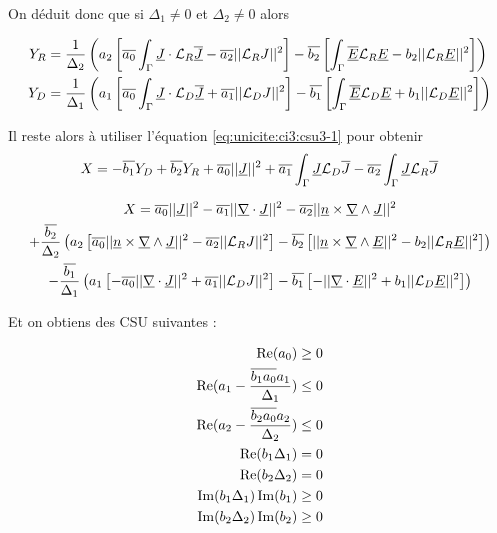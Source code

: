 On déduit donc que si $\Delta_1 \not = 0$ et $\Delta_2 \not = 0$ alors

\begin{align}
  Y_R &= \frac{1}{\Delta_2}\left(a_2\left[\conj{a_0}\int_\Gamma \J\cdot\LR\conj{\J} - \conj{a_2}||\LR J||^2\right]  -\conj{b_2}\left[\int_\Gamma \conj{\E}\LR{\E} - b_2 ||\LR \E ||^2\right]\right) \\
  Y_D &= \frac{1}{\Delta_1}\left(a_1\left[\conj{a_0}\int_\Gamma \J\cdot\LD\conj{\J} + \conj{a_1}||\LD J||^2\right]  -\conj{b_1}\left[\int_\Gamma \conj{\E}\LD{\E} + b_1 ||\LD \E ||^2\right]\right) 
\end{align}

Il reste alors à utiliser l'équation \eqref{eq:unicite:ci3:csu3-1} pour obtenir
\begin{equation}
X = -\conj{b_1} Y_D + \conj{b_2} Y_R + \conj{a_0} || \J ||^2 + \conj{a_1} \int_\Gamma \J \LD \conj{J} - \conj{a_2} \int_\Gamma \J \LR \conj{J} 
\end{equation}

\begin{multline}
X = \conj{a_0} || \J ||^2 - \conj{a_1} || \div \J ||^2 - \conj{a_2} || \n \times \rot \J ||^2\\
 + \frac{\conj{b_2}}{\Delta_2}\left(a_2\left[\conj{a_0}||\n \times \rot \J||^2 - \conj{a_2}||\LR J||^2\right]  -\conj{b_2}\left[||\n\times\rot\E||^2 - b_2 ||\LR \E ||^2\right]\right) \\
 - \frac{\conj{b_1}}{\Delta_1}\left(a_1\left[-\conj{a_0}||\div\J||^2 + \conj{a_1}||\LD J||^2\right]  -\conj{b_1}\left[-||\div\E||^2 + b_1 ||\LD \E ||^2\right]\right)
\end{multline}

Et on obtiens des CSU suivantes :

\begin{align}
\Re(a_0)\ge 0 \\
\Re(a_1 - \frac{\conj{b_1a_0}a_1}{\Delta_1}) \le 0 \\
\Re(a_2 - \frac{\conj{b_2a_0}a_2}{\Delta_2}) \le 0 \\
\Re(b_1\Delta_1) = 0 \\
\Re(b_2\Delta_2) = 0 \\
\Im(b_1\Delta_1)\Im(b_1)\ge 0\\
\Im(b_2\Delta_2)\Im(b_2)\ge 0\\
\end{align}